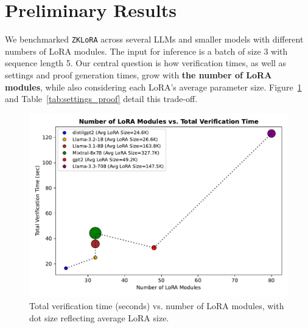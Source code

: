 \documentclass[11pt]{article}
\begin{document}
\section{Preliminary Results}

We benchmarked \texttt{ZKLoRA} across several LLMs and smaller models with different numbers of LoRA modules. The input for inference is a batch of size 3 with sequence length 5. Our central question is how verification times, as well as settings and proof generation times, grow with \textbf{the number of LoRA modules}, while also considering each LoRA's average parameter size. 
Figure~\ref{fig:verify_vs_numlora} and Table~\ref{tab:settings_proof} detail this trade-off.\footnotemark[2]


\begin{figure}[ht]
    \centering
    \includegraphics[width=0.9\linewidth]{figs/fig_verify_vs_numlora.pdf}
    \caption{Total verification time (seconds) vs. number of LoRA modules, with dot size reflecting average LoRA size.}
    \label{fig:verify_vs_numlora}
\end{figure}
\end{document}
